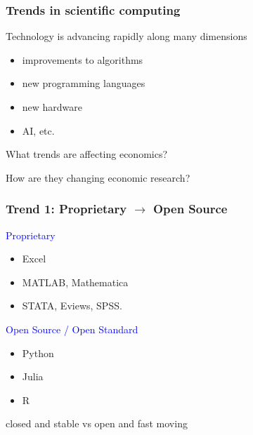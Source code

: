 \documentclass[
    xcolor={svgnames,dvipsnames},
    hyperref={colorlinks, citecolor=DeepPink4, linkcolor=DarkRed, urlcolor=DarkBlue}
    ]{beamer}  %
\newcommand{\blue}[1]{\textcolor{Blue}{\sf #1}}
\newcommand{\1}{\mathbbm 1}
\begin{document}
\begin{frame}
    \frametitle{Trends in scientific computing}

    Technology is advancing rapidly along many dimensions
    \begin{itemize}
        \item improvements to algorithms
    \vspace{0.3em}
        \item new programming languages
    \vspace{0.3em}
        \item new hardware
    \vspace{0.3em}
        \item AI, etc.
    \end{itemize}

    \vspace{0.3em}
    \vspace{0.3em}
    What trends are affecting economics?

    \vspace{0.3em}
    \vspace{0.3em}
    How are they changing economic research?

\end{frame}


\begin{frame}
    \frametitle{Trend 1: Proprietary $\to$ Open Source}
    
    \blue{Proprietary} 
    \begin{itemize}
        \item Excel
        \item MATLAB, Mathematica
        \item STATA, Eviews, SPSS.
    \end{itemize}
    

    \vspace{0.5em}
    \vspace{0.5em}
    \blue{Open Source / Open Standard} 
    
    \begin{itemize}
        \item Python
        \item Julia
        \item R
    \end{itemize}


    \begin{center}
        closed and stable vs open and fast moving
    \end{center}

\end{frame}
\end{document}
